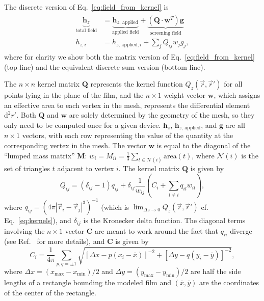 \documentclass[final,3p,times,twocolumn]{elsarticle}
\begin{document}
The discrete version of Eq.~\ref{eq:field_from_kernel} is
\begin{align}
\begin{split}
    \label{eq:field_from_kernel_num}
    \underbrace{\mathbf{h}_z}_\text{total field}
    &= \underbrace{\mathbf{h}_{z,\,\mathrm{applied}}}_\text{applied field}
    + \underbrace{(\mathbf{Q}\cdot\mathbf{w}^T)\mathbf{g}}_\text{screening field}\\
    h_{z, i} &= h_{z,\,\mathrm{applied}, i} + \sum_j Q_{ij}w_jg_j,
\end{split}
\end{align}
where for clarity we show both the matrix version of Eq.~\ref{eq:field_from_kernel} (top line) and the equivalent discrete sum version (bottom line).

The $n\times n$ kernel matrix $\mathbf{Q}$ represents the kernel function $Q_z(\vec{r},\vec{r}')$ for all points lying in the plane of the film, and the $n\times 1$ weight vector $\mathbf{w}$, which assigns an effective area to each vertex in the mesh, represents the differential element $\mathrm{d}^2r'$. Both $\mathbf{Q}$ and $\mathbf{w}$ are solely determined by the geometry of the mesh, so they only need to be computed once for a given device. $\mathbf{h}_z$, $\mathbf{h}_{z,\,\mathrm{applied}}$, and $\mathbf{g}$ are all $n\times 1$ vectors, with each row representing the value of the quantity at the
corresponding vertex in the mesh. The vector $\mathbf{w}$ is equal to the diagonal of the ``lumped mass matrix'' $\mathbf{M}$: $w_i=M_{ii} = \frac{1}{3}\sum_{t\in\mathcal{N}(i)}\mathrm{area}(t)$,
where $\mathcal{N}(i)$ is the set of triangles $t$ adjacent to vertex $i$. The kernel matrix $\mathbf{Q}$ is given by
\begin{equation}
    \label{eq:kernel_matrix}
    Q_{ij} = (\delta_{ij}-1)q_{ij}
    + \delta_{ij}\frac{1}{w_{ij}}\left(C_i + \sum_{l\neq i}q_{il}w_{il}\right),
\end{equation}
where $q_{ij} = \left(4\pi|\vec{r}_i-\vec{r}_j|^3\right)^{-1}$
(which is $\lim_{\Delta z\to 0}Q_z(\vec{r},\vec{r}')$ cf. Eq.~\ref{eq:kernels}),
and $\delta_{ij}$ is the Kronecker delta function. The diagonal terms involving the $n\times 1$ vector $\mathbf{C}$ are meant to work around the fact that $q_{ii}$ diverge (see Ref.~\cite{Brandt2005-wj} for more details), and $\mathbf{C}$ is given by
\begin{equation}
    \label{eq:C_vector}
    C_i = \frac{1}{4\pi}\sum_{p,q=\pm1}\sqrt{[\Delta x - p(x_i-\bar{x})]^{-2} + [\Delta y - q(y_i-\bar{y})]^{-2}},
\end{equation}
where $\Delta x=(x_\mathrm{max}-x_\mathrm{min})/2$ and $\Delta y=(y_\mathrm{max}-y_\mathrm{min})/2$ are half the side lengths of a rectangle bounding the modeled film and $(\bar{x}, \bar{y})$ are the coordinates of the center of the rectangle.
\end{document}
